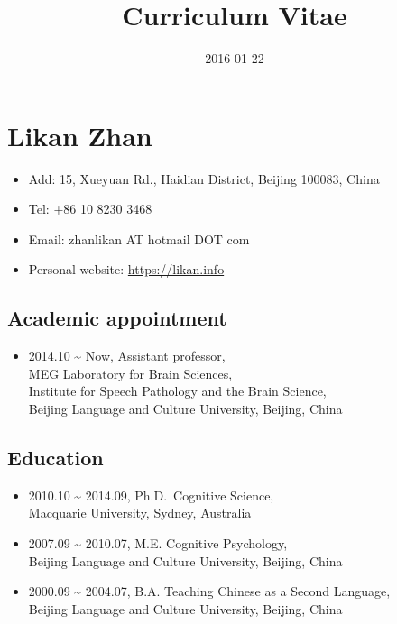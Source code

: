 \documentclass[10pt,]{article}
\title{Curriculum Vitae}
\date{2016-01-22}
\providecommand{\tightlist}{%
  \setlength{\itemsep}{0pt}\setlength{\parskip}{0pt}}
\begin{document}

\hypertarget{likan-zhan}{%
\section{Likan Zhan}\label{likan-zhan}}

\begin{itemize}
\tightlist
\item
  Add: 15, Xueyuan Rd., Haidian District, Beijing 100083, China
\item
  Tel: +86 10 8230 3468
\item
  Email: zhanlikan AT hotmail DOT com
\item
  Personal website: \url{https://likan.info}
\end{itemize}

\hypertarget{academic-appointment}{%
\subsection{Academic appointment}\label{academic-appointment}}

\begin{itemize}
\tightlist
\item
  2014.10 \textasciitilde{} Now, Assistant professor,\\
  MEG Laboratory for Brain Sciences, \\
  Institute for Speech Pathology and the Brain Science,\\
  Beijing Language and Culture University, Beijing, China
\end{itemize}

\hypertarget{education}{%
\subsection{Education}\label{education}}

\begin{itemize}
\item
  2010.10 \textasciitilde{} 2014.09, Ph.D.~Cognitive Science, \\
  Macquarie University, Sydney, Australia
\item
  2007.09 \textasciitilde{} 2010.07, M.E. Cognitive Psychology, \\
  Beijing Language and Culture University, Beijing, China
\item
  2000.09 \textasciitilde{} 2004.07, B.A. Teaching Chinese as a Second
  Language, \\
  Beijing Language and Culture University, Beijing, China
\end{itemize}
\end{document}
